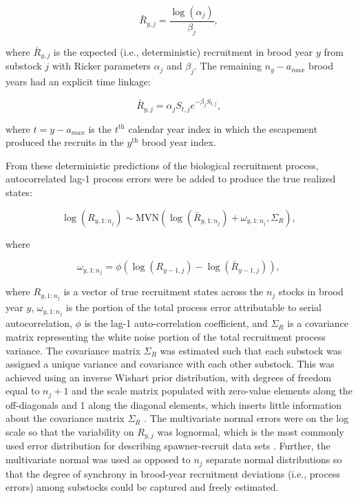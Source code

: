 \documentclass[12pt,]{book}
\theoremstyle{definition}
\theoremstyle{definition}
\theoremstyle{definition}
\theoremstyle{remark}
\begin{document}
\begin{equation}
  \bar{R}_{y,j}=\frac{\log(\alpha_j)}{\beta_j},
  \label{eq:unfished-R0}
\end{equation}

\noindent
where \(\bar{R}_{y,j}\) is the expected (i.e., deterministic)
recruitment in brood year \(y\) from substock \(j\) with Ricker
parameters \(\alpha_j\) and \(\beta_j\). The remaining \(n_y - a_{max}\)
brood years had an explicit time linkage:

\begin{equation}
  \bar{R}_{y,j} = \alpha_j S_{t,j} e^{-\beta_j S_{t,j}},
  \label{eq:tsm-ricker-pred}
\end{equation}

\noindent
where \(t = y-a_{max}\) is the \(t^{\text{th}}\) calendar year index in
which the escapement produced the recruits in the \(y^{\text{th}}\)
brood year index.

From these deterministic predictions of the biological recruitment
process, autocorrelated lag-1 process errors were be added to produce
the true realized states:

\begin{equation}
  \log(R_{y,1:n_j}) \sim \text{MVN}\left(\log(\bar{R}_{y,1:n_j}) + \omega_{y,1:n_j}, \Sigma_R\right),
  \label{eq:tsm-ricker-anomalies}
\end{equation}

\noindent
where

\begin{equation}
  \omega_{y,1:n_j} = \phi \left(\log(R_{y-1,j}) - \log(\bar{R}_{y-1,j}) \right),
  \label{eq:tsm-omega}
\end{equation}

\noindent
where \(R_{y,1:n_j}\) is a vector of true recruitment states across the
\(n_j\) stocks in brood year \(y\), \(\omega_{y,1:n_j}\) is the portion
of the total process error attributable to serial autocorrelation,
\(\phi\) is the lag-1 auto-correlation coefficient, and \(\Sigma_R\) is
a covariance matrix representing the white noise portion of the total
recruitment process variance. The covariance matrix \(\Sigma_R\) was
estimated such that each substock was assigned a unique variance and
covariance with each other substock. This was achieved using an inverse
Wishart prior distribution, with degrees of freedom equal to \(n_j + 1\)
and the scale matrix populated with zero-value elements along the
off-diagonals and 1 along the diagonal elements, which inserts little
information about the covariance matrix \(\Sigma_R\)
\citep{plummer-2017}. The multivariate normal errors were on the log
scale so that the variability on \(R_{y,j}\) was lognormal, which is the
most commonly used error distribution for describing spawner-recruit
data sets \citep{walters-martell-2004}. Further, the multivariate normal
was used as opposed to \(n_j\) separate normal distributions so that the
degree of synchrony in brood-year recruitment deviations (i.e., process
errors) among substocks could be captured and freely estimated.
\end{document}
